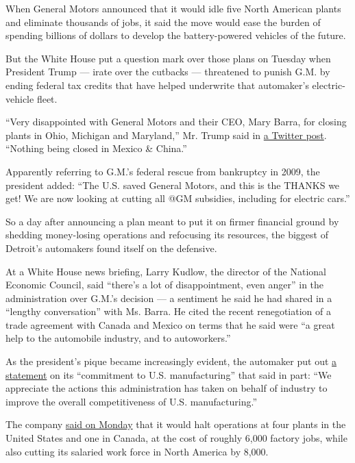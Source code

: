 When General Motors announced that it would idle five North American
plants and eliminate thousands of jobs, it said the move would ease the
burden of spending billions of dollars to develop the battery-powered
vehicles of the future.

But the White House put a question mark over those plans on Tuesday when
President Trump --- irate over the cutbacks --- threatened to punish
G.M. by ending federal tax credits that have helped underwrite that
automaker's electric-vehicle fleet.

``Very disappointed with General Motors and their CEO, Mary Barra, for
closing plants in Ohio, Michigan and Maryland,'' Mr. Trump said in
\href{https://twitter.com/realDonaldTrump/status/1067494680416407552}{a
Twitter post}. ``Nothing being closed in Mexico \& China.''

Apparently referring to G.M.'s federal rescue from bankruptcy in 2009,
the president added: ``The U.S. saved General Motors, and this is the
THANKS we get! We are now looking at cutting all @GM subsidies,
including for electric cars.''

So a day after announcing a plan meant to put it on firmer financial
ground by shedding money-losing operations and refocusing its resources,
the biggest of Detroit's automakers found itself on the defensive.

At a White House news briefing, Larry Kudlow, the director of the
National Economic Council, said ``there's a lot of disappointment, even
anger'' in the administration over G.M.'s decision --- a sentiment he
said he had shared in a ``lengthy conversation'' with Ms. Barra. He
cited the recent renegotiation of a trade agreement with Canada and
Mexico on terms that he said were ``a great help to the automobile
industry, and to autoworkers.''

As the president's pique became increasingly evident, the automaker put
out
\href{https://media.gm.com/media/us/en/gm/home.detail.html/content/Pages/news/us/en/2018/nov/1127-gm-statement.html}{a
statement} on its ``commitment to U.S. manufacturing'' that said in
part: ``We appreciate the actions this administration has taken on
behalf of industry to improve the overall competitiveness of U.S.
manufacturing.''

The company
\href{https://www.nytimes.com/2018/11/26/business/general-motors-cutbacks.html}{said
on Monday} that it would halt operations at four plants in the United
States and one in Canada, at the cost of roughly 6,000 factory jobs,
while also cutting its salaried work force in North America by 8,000.


